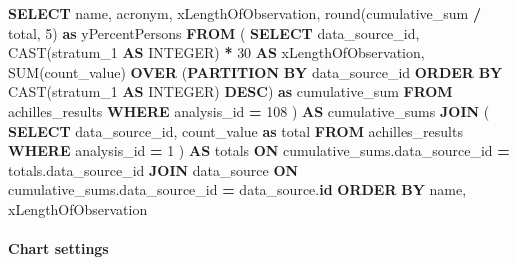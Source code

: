 \documentclass[
]{book}
\newenvironment{Shaded}{\begin{snugshade}}{\end{snugshade}}
\newcommand{\DataTypeTok}[1]{\textcolor[rgb]{0.13,0.29,0.53}{#1}}
\newcommand{\DecValTok}[1]{\textcolor[rgb]{0.00,0.00,0.81}{#1}}
\newcommand{\FunctionTok}[1]{\textcolor[rgb]{0.00,0.00,0.00}{#1}}
\newcommand{\KeywordTok}[1]{\textcolor[rgb]{0.13,0.29,0.53}{\textbf{#1}}}
\newcommand{\NormalTok}[1]{#1}
\newcommand{\OperatorTok}[1]{\textcolor[rgb]{0.81,0.36,0.00}{\textbf{#1}}}
\begin{document}
\begin{Shaded}
\begin{Highlighting}[]
\KeywordTok{SELECT}
\NormalTok{  name,}
\NormalTok{  acronym,}
\NormalTok{  xLengthOfObservation,}
  \FunctionTok{round}\NormalTok{(cumulative\_sum }\OperatorTok{/}\NormalTok{ total, }\DecValTok{5}\NormalTok{) }\KeywordTok{as}\NormalTok{ yPercentPersons}
\KeywordTok{FROM}\NormalTok{ (}
  \KeywordTok{SELECT}\NormalTok{ data\_source\_id, }\FunctionTok{CAST}\NormalTok{(stratum\_1 }\KeywordTok{AS} \DataTypeTok{INTEGER}\NormalTok{) }\OperatorTok{*} \DecValTok{30} \KeywordTok{AS}\NormalTok{ xLengthOfObservation, }\FunctionTok{SUM}\NormalTok{(count\_value) }\KeywordTok{OVER}\NormalTok{ (}\KeywordTok{PARTITION} \KeywordTok{BY}\NormalTok{ data\_source\_id }\KeywordTok{ORDER} \KeywordTok{BY} \FunctionTok{CAST}\NormalTok{(stratum\_1 }\KeywordTok{AS} \DataTypeTok{INTEGER}\NormalTok{) }\KeywordTok{DESC}\NormalTok{) }\KeywordTok{as}\NormalTok{ cumulative\_sum}
  \KeywordTok{FROM}\NormalTok{ achilles\_results}
  \KeywordTok{WHERE}\NormalTok{ analysis\_id }\OperatorTok{=} \DecValTok{108}
\NormalTok{) }\KeywordTok{AS}\NormalTok{ cumulative\_sums}
\KeywordTok{JOIN}\NormalTok{ (}
  \KeywordTok{SELECT}\NormalTok{ data\_source\_id, count\_value }\KeywordTok{as}\NormalTok{ total}
  \KeywordTok{FROM}\NormalTok{ achilles\_results}
  \KeywordTok{WHERE}\NormalTok{ analysis\_id }\OperatorTok{=} \DecValTok{1}
\NormalTok{) }\KeywordTok{AS}\NormalTok{ totals}
\KeywordTok{ON}\NormalTok{ cumulative\_sums.data\_source\_id }\OperatorTok{=}\NormalTok{ totals.data\_source\_id}
\KeywordTok{JOIN}\NormalTok{ data\_source }\KeywordTok{ON}\NormalTok{ cumulative\_sums.data\_source\_id }\OperatorTok{=}\NormalTok{ data\_source.}\KeywordTok{id}
\KeywordTok{ORDER} \KeywordTok{BY}\NormalTok{ name, xLengthOfObservation}
\end{Highlighting}
\end{Shaded}

\hypertarget{chart-settings-34}{%
\paragraph*{Chart settings}\label{chart-settings-34}}
\end{document}

